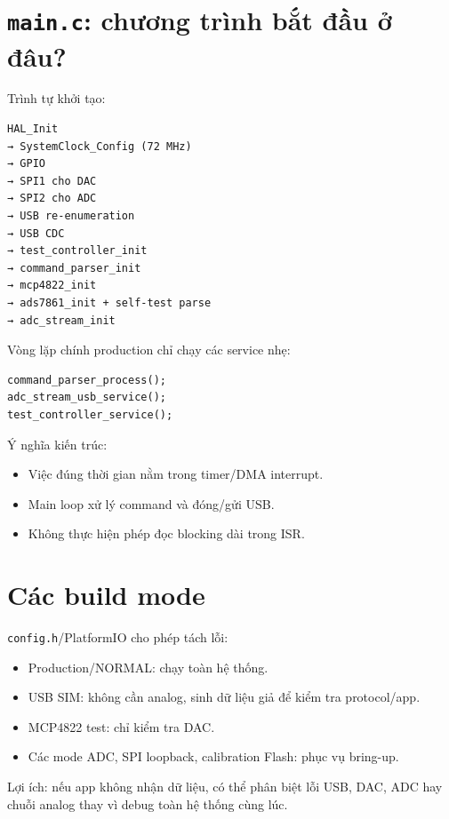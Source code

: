 \documentclass[12pt,a4paper,oneside]{article}
\newcommand{\inlinecode}[1]{\texttt{#1}}
\begin{document}
\section{\inlinecode{main.c}: chương trình bắt đầu ở đâu?}

Trình tự khởi tạo:

\begin{Verbatim}[breaklines=true,breakanywhere=true,fontsize=\small]
HAL_Init
→ SystemClock_Config (72 MHz)
→ GPIO
→ SPI1 cho DAC
→ SPI2 cho ADC
→ USB re-enumeration
→ USB CDC
→ test_controller_init
→ command_parser_init
→ mcp4822_init
→ ads7861_init + self-test parse
→ adc_stream_init
\end{Verbatim}

Vòng lặp chính production chỉ chạy các service nhẹ:

\begin{Verbatim}[breaklines=true,breakanywhere=true,fontsize=\small]
command_parser_process();
adc_stream_usb_service();
test_controller_service();
\end{Verbatim}

Ý nghĩa kiến trúc:

\begin{itemize}
\item Việc đúng thời gian nằm trong timer/DMA interrupt.
\item Main loop xử lý command và đóng/gửi USB.
\item Không thực hiện phép đọc blocking dài trong ISR.
\end{itemize}

\section{Các build mode}

\inlinecode{config.h}/PlatformIO cho phép tách lỗi:

\begin{itemize}
\item Production/NORMAL: chạy toàn hệ thống.
\item USB SIM: không cần analog, sinh dữ liệu giả để kiểm tra protocol/app.
\item MCP4822 test: chỉ kiểm tra DAC.
\item Các mode ADC, SPI loopback, calibration Flash: phục vụ bring-up.
\end{itemize}

Lợi ích: nếu app không nhận dữ liệu, có thể phân biệt lỗi USB, DAC, ADC hay chuỗi analog thay vì debug toàn hệ thống cùng lúc.
\end{document}
